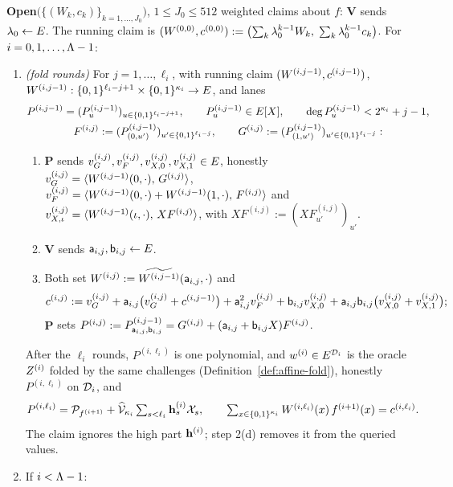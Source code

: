 \begin{protocol}
\smallskip
\textbf{Open}$\bigl(\{(W_k, c_k)\}_{k = 1, \dots, J_0}\bigr)$, $1\le J_0\le512$ weighted claims about $f$: $\mathbf{V}$ sends $\lambda_0 \leftarrow E$. The running claim is $(W^{(0,0)}, c^{(0,0)}) := \bigl(\sum_{k} \lambda_0^{k-1} W_k,\; \sum_{k} \lambda_0^{k-1} c_k\bigr)$. For $i = 0, 1, \dots, \Lambda - 1$:
\begin{enumerate}[itemsep=0.5pt,topsep=2pt]
\item \emph{(fold rounds)} For $j = 1, \dots, \ell_i$, with running claim $(W^{(i,j-1)}, c^{(i,j-1)})$, $W^{(i,j-1)}:\{0,1\}^{\ell_i-j+1}\times\{0,1\}^{\kappa_i}\to E$, and lanes
\[
\begin{gathered}
P^{(i,j-1)}=(P^{(i,j-1)}_u)_{u\in\{0,1\}^{\ell_i-j+1}},\qquad P^{(i,j-1)}_u\in E[X],\qquad \deg P^{(i,j-1)}_u<2^{\kappa_i}+j-1,\\
F^{(i,j)}:=(P^{(i,j-1)}_{(0,u')})_{u'\in\{0,1\}^{\ell_i-j}},\qquad G^{(i,j)}:=(P^{(i,j-1)}_{(1,u')})_{u'\in\{0,1\}^{\ell_i-j}}:
\end{gathered}
\]
\begin{enumerate}[itemsep=0.5pt,topsep=1pt,label=(\alph*)]
\item $\mathbf{P}$ sends $v^{(i,j)}_G, v^{(i,j)}_F, v_{X,0}^{(i,j)}, v_{X,1}^{(i,j)} \in E$, honestly $v^{(i,j)}_G = \langle W^{(i,j-1)}(0,\cdot),\, G^{(i,j)} \rangle$, $v^{(i,j)}_F=\langle W^{(i,j-1)}(0,\cdot)+W^{(i,j-1)}(1,\cdot),\, F^{(i,j)} \rangle$ and $v_{X,\iota}^{(i,j)}=\langle W^{(i,j-1)}(\iota,\cdot),\, XF^{(i,j)} \rangle$, with $XF^{(i,j)}:=(X F^{(i,j)}_{u'})_{u'}$.
\item $\mathbf{V}$ sends $\mathsf{a}_{i,j}, \mathsf{b}_{i,j} \leftarrow E$.
\item Both set $W^{(i,j)} := \widetilde{W^{(i,j-1)}}(\mathsf{a}_{i,j},\cdot)$ and
\[
c^{(i,j)} := v^{(i,j)}_G+\mathsf{a}_{i,j}\bigl(v^{(i,j)}_G+c^{(i,j-1)}\bigr)+\mathsf{a}_{i,j}^2v^{(i,j)}_F+\mathsf{b}_{i,j}v_{X,0}^{(i,j)}+\mathsf{a}_{i,j}\mathsf{b}_{i,j}\bigl(v_{X,0}^{(i,j)}+v_{X,1}^{(i,j)}\bigr);
\]
$\mathbf{P}$ sets $P^{(i,j)} := P^{(i,j-1)}_{\mathsf{a}_{i,j},\mathsf{b}_{i,j}} = G^{(i,j)}+(\mathsf{a}_{i,j}+\mathsf{b}_{i,j}X)F^{(i,j)}$.
\end{enumerate}
After the $\ell_i$ rounds, $P^{(i,\ell_i)}$ is one polynomial, and $w^{(i)}\in E^{\mathcal{D}_i}$ is the oracle $Z^{(i)}$ folded by the same challenges (Definition~\ref{def:affine-fold}), honestly $P^{(i,\ell_i)}$ on $\mathcal{D}_i$, and
\[
P^{(i,\ell_i)}=\mathcal{P}_{f^{(i+1)}}+\widehat{\mathcal{V}}_{\kappa_i}\textstyle\sum_{s<\ell_i}\mathbf{h}^{(i)}_s\mathcal{X}_s,\qquad \sum_{x\in\{0,1\}^{\kappa_i}}W^{(i,\ell_i)}(x)\,f^{(i+1)}(x)=c^{(i,\ell_i)}.
\]
The claim ignores the high part $\mathbf{h}^{(i)}$; step 2(d) removes it from the queried values.
\item If $i < \Lambda - 1$:

\end{enumerate}
\end{protocol}
